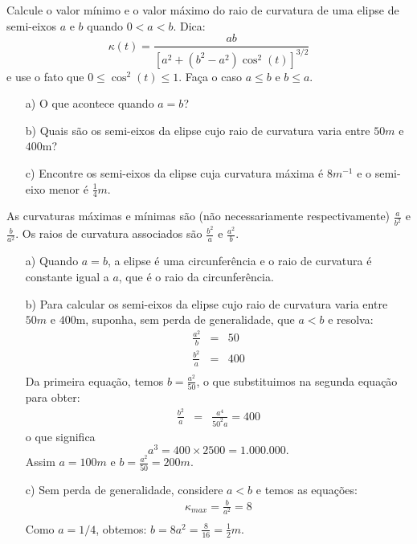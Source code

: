 \begin{exeresol}
Calcule o valor mínimo e o valor máximo do raio de curvatura de uma elipse de semi-eixos $a$ e $b$ quando $0<a<b$. 
Dica:
$$\kappa(t)=\frac{ab}{\left[a^2+(b^2-a^2)\cos^2(t)\right]^{3/2}}$$
e use o fato que $0\leq \cos^2(t) \leq1$. Faça o caso $a\leq b$ e $b \leq a$.

\begin{itemize}
 \item[a)] O que acontece quando $a=b$?
 \item[b)] Quais são os semi-eixos da elipse cujo raio de curvatura varia entre $50m$ e $400$m?
 \item[c)] Encontre os semi-eixos da elipse cuja curvatura máxima é $8m^{-1}$ e o semi-eixo menor é $\frac{1}{4}m$.
\end{itemize}
\end{exeresol}
\begin{resol}
As curvaturas máximas e mínimas são (não necessariamente respectivamente) $\frac{a}{b^2}$ e $\frac{b}{a^2}$. Os raios de curvatura associados são $\frac{b^2}{a}$ e $\frac{a^2}{b}$.
\begin{itemize}
 \item[a)] Quando $a=b$, a elipse é uma circunferência e o raio de curvatura é constante igual a $a$, que é o raio da circunferência.
\item[b)] Para calcular os semi-eixos da elipse cujo raio de curvatura varia entre $50m$ e $400$m, suponha, sem perda de generalidade, que $a<b$ e resolva:
 \begin{eqnarray*}
  \frac{a^2}{b} &=& 50\\
  \frac{b^2}{a} &=& 400\\
 \end{eqnarray*}
 Da primeira equação, temos $b=\frac{a^2}{50}$, o que substituimos na segunda equação para obter:
 \begin{eqnarray*}
   \frac{b^2}{a} &=& \frac{a^4}{50^2a}=400
 \end{eqnarray*}
o que significa
$$a^3=400\times 2500 = 1.000.000.$$
 Assim $a=100m$ e $b=\frac{a^2}{50}=200m$.
\item[c)] Sem perda de generalidade, considere $a<b$ e temos as equações:
  \begin{eqnarray*}\kappa_{max}=\frac{b}{a^2}=8\\
  \end{eqnarray*}
     Como $a=1/4$, obtemos:
     $b=8a^2=\frac{8}{16}=\frac{1}{2}m$.
 \end{itemize}


\end{resol}

